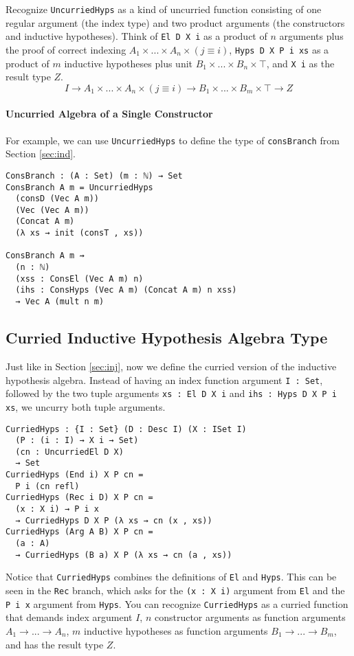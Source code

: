 \documentclass[preprint,nonatbib]{sigplanconf}
\newcommand{\refsec}[1]{Section \ref{sec:#1}}
\begin{document}
Recognize {\tt UncurriedHyps} as a kind of uncurried function
consisting of one regular argument (the index type) and two product
arguments (the constructors and inductive hypotheses). 
Think of
{\tt El D X i} as a product of $n$ arguments plus the proof of correct
indexing $A_1 × ... × A_n × (j≡i)$, {\tt Hyps D X P i xs} as a
product of $m$ inductive hypotheses plus unit $B_1 × ... × B_n × ⊤$,
and {\tt X i} as the result type $Z$.
\[
I → A_1 × ... × A_n × (j ≡ i) → B_1 × ... × B_m × ⊤ → Z
\]

\paragraph{Uncurried Algebra of a Single Constructor}

For example, we can use {\tt UncurriedHyps} to define the type of
{\tt consBranch} from \refsec{ind}.

\begin{verbatim}
ConsBranch : (A : Set) (m : ℕ) → Set
ConsBranch A m = UncurriedHyps
  (consD (Vec A m))
  (Vec (Vec A m))
  (Concat A m)
  (λ xs → init (consT , xs))

ConsBranch A m ⇝
  (n : ℕ)
  (xss : ConsEl (Vec A m) n)
  (ihs : ConsHyps (Vec A m) (Concat A m) n xss)
  → Vec A (mult n m)
\end{verbatim}

\subsection{Curried Inductive Hypothesis Algebra Type}

Just like in \refsec{inj}, now we define the curried version of
the inductive hypothesis algebra. Instead of having an index function
argument {\tt I : Set}, followed by the two tuple arguments
{\tt xs : El D X i} and {\tt ihs : Hyps D X P i xs}, we uncurry
both tuple arguments.

\begin{verbatim}
CurriedHyps : {I : Set} (D : Desc I) (X : ISet I)
  (P : (i : I) → X i → Set)
  (cn : UncurriedEl D X)
  → Set
CurriedHyps (End i) X P cn =
  P i (cn refl)
CurriedHyps (Rec i D) X P cn =
  (x : X i) → P i x
  → CurriedHyps D X P (λ xs → cn (x , xs))
CurriedHyps (Arg A B) X P cn =
  (a : A)
  → CurriedHyps (B a) X P (λ xs → cn (a , xs))
\end{verbatim}

Notice that {\tt CurriedHyps} combines the
definitions of {\tt El} and {\tt Hyps}. This can be seen in the
{\tt Rec} branch, which asks for the {\tt (x : X i)} argument
from {\tt El} and the {\tt P i x} argument from {\tt Hyps}. You can
recognize {\tt CurriedHyps} as a curried function that demands
index argument $I$, $n$ constructor arguments as function arguments
$A_1 → ... → A_n$, $m$ inductive hypotheses as function arguments
$B_1 → ... → B_m$, and has the result type $Z$.
\end{document}
